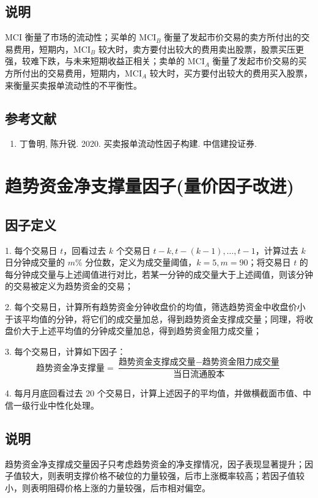 \documentclass{article}
\begin{document}
\subsection{说明}
MCI 衡量了市场的流动性；买单的 \( \mathrm{MCI}_B \) 衡量了发起市价交易的卖方所付出的交易费用，短期内，\( \mathrm{MCI}_B \) 较大时，卖方要付出较大的费用卖出股票，股票买压更强，较难下跌，与未来短期收益正相关；卖单的 \( \mathrm{MCI}_A \) 衡量了发起市价交易的买方所付出的交易费用，短期内，\( \mathrm{MCI}_A \) 较大时，买方要付出较大的费用买入股票，来衡量买卖报单流动性的不平衡性。

\subsection{参考文献}
\begin{enumerate}
    \item 丁鲁明, 陈升锐. 2020. 买卖报单流动性因子构建. 中信建投证券.
\end{enumerate}

\section{趋势资金净支撑量因子(量价因子改进)}

\subsection{因子定义}

1. 每个交易日 \( t \)，回看过去 \( k \) 个交易日 \( t-k, t-(k-1), \dots, t-1 \)，计算过去 \( k \) 日分钟成交量的 \( m\% \) 分位数，定义为成交量阈值，\( k=5, m=90 \)；将交易日 \( t \) 的每分钟成交量与上述阈值进行对比，若某一分钟的成交量大于上述阈值，则该分钟的交易被定义为趋势资金的交易；

2. 每个交易日，计算所有趋势资金分钟收盘价的均值，筛选趋势资金中收盘价小于该平均值的分钟，将它们的成交量加总，得到趋势资金支撑成交量；同理，将收盘价大于上述平均值的分钟成交量加总，得到趋势资金阻力成交量；

3. 每个交易日，计算如下因子：
\begin{equation}
    \text{趋势资金净支撑量} = \frac{\text{趋势资金支撑成交量} - \text{趋势资金阻力成交量}}{\text{当日流通股本}}
\end{equation}

4. 每月月底回看过去 20 个交易日，计算上述因子的平均值，并做横截面市值、中信一级行业中性化处理。

\subsection{说明}
趋势资金净支撑成交量因子只考虑趋势资金的净支撑情况，因子表现显著提升；因子值较大，则表明支撑价格不破位的力量较强，后市上涨概率较高；若因子值较小，则表明阻碍价格上涨的力量较强，后市相对偏空。
\end{document}
